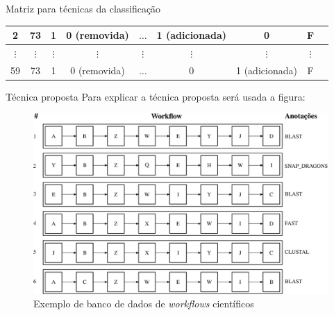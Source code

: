 \begin{frame}
\begin{block}{Matriz para técnicas da classificação}
\begin{table}[!htb]
\begin{tabular}{|c|c|c|c|c|c|c|c|c|}
				2	&		73 					   & 1 			  & 0 (removida)  & \(\ldots\)& 1 (adicionada) & 0  & F	\\ \hline
				\(\vdots\)  &		\(\vdots\) 	   & \(\vdots\)   & \(\vdots\) 	  & \(\vdots\) 	  & \(\vdots\) & \(\vdots\) & \(\vdots\)	\\ \hline
				59	&		73 					   & 1 			  & 0 (removida)  & \(\ldots\) 	  & 0 & 1 (adicionada) & F	\\ \hline
			\end{tabular}
			\label{tabela_matriz_de_dados_adapatada_classificacao_regressao}
		\end{table}
	\end{block}
\end{frame}



\begin{frame}		
	\begin{block}{Técnica proposta}
		Para explicar a técnica proposta será usada a figura:
				\begin{figure}
					\begin{minipage}[b]{0.8\textwidth}
						\includegraphics[width=\textwidth]{./secoes/SolucaoProposta/recomendacaofreqontologia.eps}
						\caption{Exemplo de banco de dados de \emph{workflows} científicos}
					\end{minipage}
				\end{figure}
	\end{block}
\end{frame}


